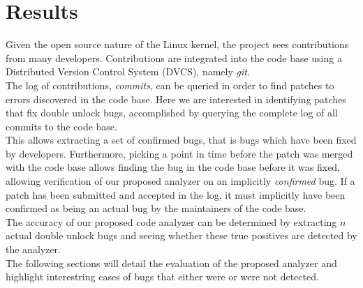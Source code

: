 \section{Results}

\noindent Given the open source nature of the Linux kernel, the project sees contributions from many developers. Contributions are integrated into the code base using a Distributed Version Control System (DVCS), namely \textit{git}. 
\\

\noindent The log of contributions, \textit{commits}, can be queried in order to find patches to errors discovered in the code base. Here we are interested in identifying patches that fix double unlock bugs, accomplished by querying the complete log of all commits to the code base. 
\\

\noindent This allows extracting a set of confirmed bugs, that is bugs which have been fixed by developers. Furthermore, picking a point in time before the patch was merged with the code base allows finding the bug in the code base before it was fixed, allowing verification of our proposed analyzer on an implicitly \textit{confirmed} bug. If a patch has been submitted and accepted in the log, it must implicitly have been confirmed as being an actual bug by the maintainers of the code base. 
\\

\noindent The accuracy of our proposed code analyzer can be determined by extracting $n$ actual double unlock bugs and seeing whether these true positives are detected by the analyzer. 
\\

\noindent The following sections will detail the evaluation of the proposed analyzer and highlight interestring cases of bugs that either were or were not detected. 
\\